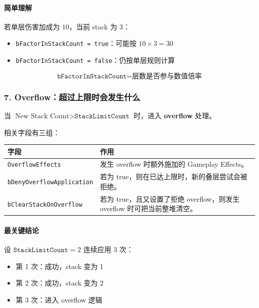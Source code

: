 \documentclass[CJKmath=true,10pt]{MyBook}
\begin{document}
\paragraph{简单理解}
若单层伤害加成为 $10$，当前 stack 为 $3$：

\begin{itemize}
	\item \texttt{bFactorInStackCount = true}：可能按 $10 \times 3 = 30$
	\item \texttt{bFactorInStackCount = false}：仍按单层规则计算
\end{itemize}

\[
\boxed{
	\texttt{bFactorInStackCount} = \text{层数是否参与数值倍率}
}
\]

\subsubsection{7. Overflow：超过上限时会发生什么}

当
$
\text{New Stack Count} > \texttt{StackLimitCount}
$
时，进入 \textbf{overflow} 处理。

相关字段有三组：

\begin{longtable}{@{}p{}p{}@{}}
	\toprule
	\textbf{字段} & \textbf{作用} \\
	\midrule
	\endhead
	
	\texttt{OverflowEffects}
	&
	发生 overflow 时额外施加的 Gameplay Effects。 \\
	\texttt{bDenyOverflowApplication}
	&
	若为 true，则在已达上限时，新的叠层尝试会被拒绝。 \\
	\texttt{bClearStackOnOverflow}
	&
	若为 true，且又设置了拒绝 overflow，则发生 overflow 时可把当前整堆清空。 \\
	\bottomrule
\end{longtable}

\paragraph{最关键结论}
设
$
\texttt{StackLimitCount} = 2
$
连续应用 3 次：

\begin{itemize}
	\item 第 1 次：成功，stack 变为 1
	\item 第 2 次：成功，stack 变为 2
	\item 第 3 次：进入 overflow 逻辑
\end{itemize}
\end{document}
